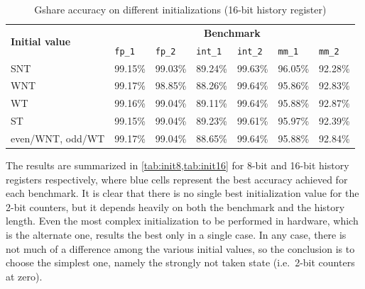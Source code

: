 \begin{table}[hbt]
  \centering
  \begin{tabular}{lllllll}
    \toprule
    \multirow{2}{*}{\textbf{Initial value}} & \multicolumn{6}{c}{\textbf{Benchmark}}                             \\
    \cmidrule{2-7}
                                   & \texttt{fp\_1}               & \texttt{fp\_2}                & \texttt{int\_1}               & \texttt{int\_2}               & \texttt{mm\_1}                & \texttt{mm\_2}                \\
    \midrule
    SNT                            & 99.15\%                      & 99.03\%                       & \cellcolor{cell_blue}89.24\% & 99.63\%                        & \cellcolor{cell_blue}96.05\%  & 92.28\%                       \\
    WNT                            & \cellcolor{cell_blue}99.17\% & 98.85\%                       & 88.26\%                      & \cellcolor{cell_blue}99.64\%   & 95.86\%                       & 92.83\%                       \\
    WT                             & 99.16\%                      & \cellcolor{cell_blue}99.04\%  & 89.11\%                      & 99.64\%                        & 95.88\%                       & \cellcolor{cell_blue}92.87\%  \\
    ST                             & 99.15\%                      & 99.04\%                       & 89.23\%                      & 99.61\%                        & 95.97\%                       & 92.39\%                       \\
    even/WNT, odd/WT               & 99.17\%                      & 99.04\%                       & 88.65\%                      & 99.64\%                        & 95.88\%                       & 92.84\%                       \\ 
    \bottomrule
  \end{tabular}
  \caption{Gshare accuracy on different initializations (16-bit history register)}
  \label{tab:init16}
\end{table}

\pagebreak
The results are summarized in \cref{tab:init8,tab:init16} for 8-bit and 16-bit history registers respectively, where blue cells represent the best accuracy achieved for each benchmark. It is clear that there is no single best initialization value for the 2-bit counters, but it depends heavily on both the benchmark and the history length. Even the most complex initialization to be performed in hardware, which is the alternate one, results the best only in a single case. In any case, there is not much of a difference among the various initial values, so the conclusion is to choose the simplest one, namely the strongly not taken state (i.e.\ 2-bit counters at zero).

